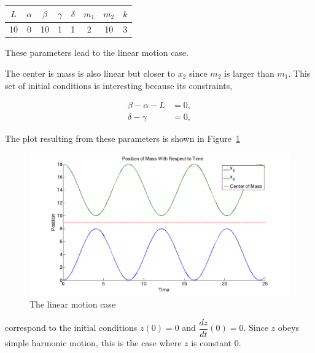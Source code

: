 \documentclass[11pt, oneside]{article}   	%
\begin{document}
\begin{center}

\begin{tabular}{| c | c | c | c | c | c | c | c |}

\hline

$L$ & $\alpha$ & $\beta$ & $\gamma$ & $\delta$ & $m_1$ & $m_2$ & $k$ \\

\hline

 10 & 0 & 10 & 1 & 1 & 2 & 10 & 3\\

\hline

\end{tabular}

\end{center}

These parameters lead to the linear motion case.

The center is mass is also linear but closer to $x_2$ since $m_2$ is larger than $m_1$. This set of initial conditions is interesting because its constraints,

\begin{align*}
\beta - \alpha - L &= 0,\\
\delta - \gamma &= 0,
\end{align*}

The plot resulting from these parameters is shown in Figure~\ref{sanity2}

\begin{figure}[h!]
\centering \includegraphics[scale=0.3]{sanity1}
\caption{\label{sanity2} The linear motion case}
\end{figure}

correspond to the initial conditions $z(0)=0$ and $\dfrac{dz}{dt}(0) = 0$. Since $z$ obeys simple harmonic motion, this is the case where $z$ is constant 0.
\end{document}

